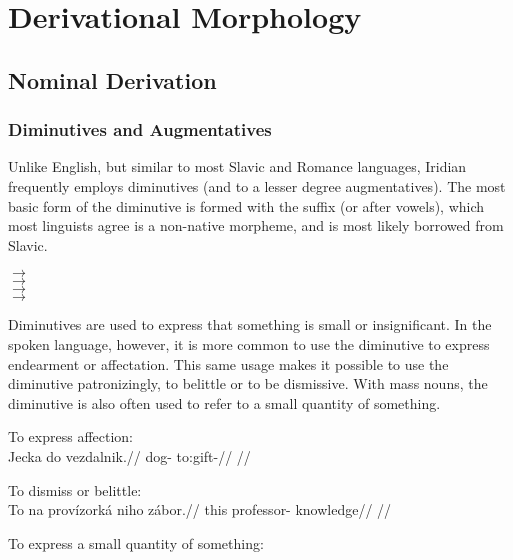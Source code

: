\chapter{Derivational Morphology}

\section{Nominal Derivation}

\subsection{Diminutives and Augmentatives}\label{sec:diminutive}

Unlike English, but similar to most Slavic and Romance languages, Iridian frequently employs diminutives (and to a lesser degree augmentatives). The most basic form of the diminutive is formed with the suffix  (or  after vowels), which most linguists agree is a non-native morpheme, and is most likely borrowed from Slavic.

\ex
{} $\rightarrow$ \\
 $\rightarrow$  \\
 $\rightarrow$  \\
 $\rightarrow$  
\xe

Diminutives are used to express that something is small or insignificant. In the spoken language, however, it is more common to use the diminutive to express endearment or affectation. This same usage makes it possible to use the diminutive patronizingly, to belittle or to be dismissive. With mass nouns, the diminutive is also often used to refer to a small quantity of something.

\pex
\a To express affection:\\
\begingl
\gla Jecka do vezdalnik.//
\glb dog-  to:gift-//
\glft {}//
\endgl

\a To dismiss or belittle:\\
\begingl
\gla To na prov\'izork\'a niho z\'abor.//
\glb this  professor-  knowledge//
\glft {}//
\endgl

\a To express a small quantity of something:\\
\xe


